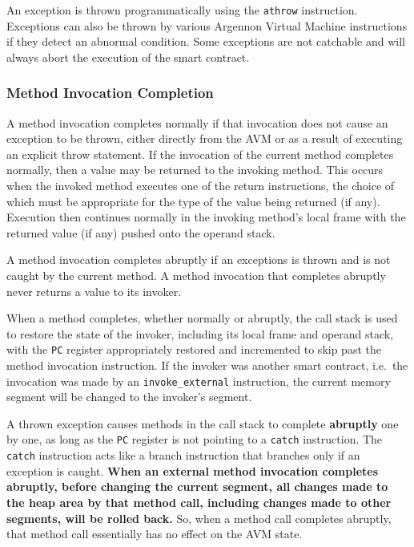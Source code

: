 \documentclass[a4paper]{report}
\begin{document}
    An exception is thrown programmatically using the \texttt{athrow} instruction. Exceptions can also be thrown by
    various Argennon Virtual Machine instructions if they detect an abnormal condition. Some exceptions are not
    catchable and will always abort the execution of the smart contract.

    \subsubsection{Method Invocation Completion}

    A method invocation completes normally if that invocation does not cause an exception to be thrown, either
    directly from the AVM or as a result of executing an explicit throw statement. If the invocation of the current
    method completes normally, then a value may be returned to the invoking method. This occurs when the invoked
    method executes one of the return instructions, the choice of which must be appropriate for the type of the value
    being returned (if any). Execution then continues normally in the invoking method's local frame with the returned
    value (if any) pushed onto the operand stack.

    A method invocation completes abruptly if an exceptions is thrown and is not caught by the current method. A
    method invocation that completes abruptly never returns a value to its invoker.

    When a method completes, whether normally or abruptly, the call stack is used to restore the state of the invoker,
    including its local frame and operand stack, with the \texttt{PC} register appropriately restored and incremented
    to skip past the method invocation instruction. If the invoker was another smart contract, i.e.\ the invocation
    was made by an \texttt{invoke\_external} instruction, the current memory segment will be changed to the invoker's
    segment.

    A thrown exception causes methods in the call stack to complete \textbf{abruptly} one by one, as long as the
    \texttt{PC} register is not pointing to a \texttt{catch} instruction. The \texttt{catch} instruction acts like a
    branch instruction that branches only if an exception is caught. \textbf{When an external method invocation
    completes abruptly, before changing the current segment, all changes made to the heap area by that method
    call, including changes made to other segments, will be rolled back.} So, when a method call completes abruptly,
    that method call essentially has no effect on the AVM state.
\end{document}
